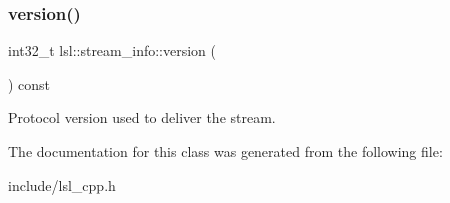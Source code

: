 \subsubsection{\texorpdfstring{version()}{version()}}
{\footnotesize\ttfamily int32\+\_\+t lsl\+::stream\+\_\+info\+::version (\begin{DoxyParamCaption}{ }\end{DoxyParamCaption}) const\hspace{0.3cm}{\ttfamily [inline]}}

Protocol version used to deliver the stream. 

The documentation for this class was generated from the following file\+:\begin{DoxyCompactItemize}
\item 
include/lsl\+\_\+cpp.\+h\end{DoxyCompactItemize}
